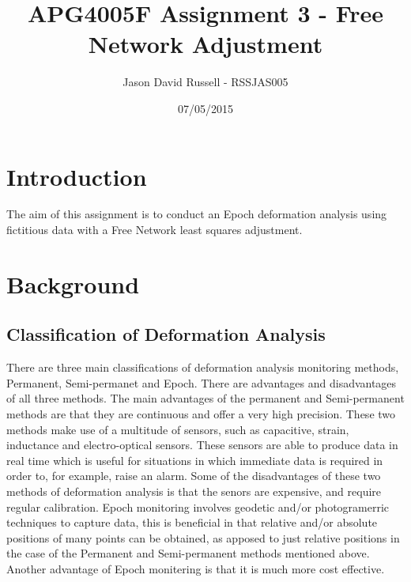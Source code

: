 \documentclass{article}
\title{APG4005F Assignment 3 - Free Network Adjustment}
\date{07/05/2015}
\author{Jason David Russell - RSSJAS005}
\begin{document}
\maketitle
{}

\newpage
\tableofcontents


\newpage
\section{Introduction}
The aim of this assignment is to conduct an Epoch deformation analysis using
fictitious data with a Free Network least squares adjustment.


\section{Background}
\subsection{Classification of Deformation Analysis}
There are three main classifications of deformation analysis monitoring methods,
Permanent, Semi-permanet and Epoch. There are advantages and disadvantages of all
three methods. The main advantages of the permanent and Semi-permanent methods
are that they are continuous and offer a very high precision. These two methods
make use of a multitude of sensors, such as capacitive, strain, inductance and
electro-optical sensors. These sensors are able to produce data in real time which
is useful for situations in which immediate data is required in order to, for
example, raise an alarm. Some of the disadvantages of these two methods of
deformation analysis is that the senors are expensive, and require regular
calibration. Epoch monitoring involves geodetic and/or photogramerric techniques
to capture data, this is beneficial in that relative and/or absolute positions of
many points can be obtained, as apposed to just relative positions in the case
of the Permanent and Semi-permanent methods mentioned above. Another advantage
of Epoch monitering is that it is much more cost effective.
\end{document}
